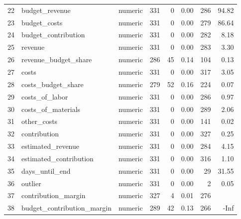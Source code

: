 \begin{sidewaystable}[ht]
\begin{tabular}{rllrrrrr}
  22 & budget\_revenue & numeric & 331 &   0 & 0.00 & 286 & 94.82 \\ 
  23 & budget\_costs & numeric & 331 &   0 & 0.00 & 279 & 86.64 \\ 
  24 & budget\_contribution & numeric & 331 &   0 & 0.00 & 282 & 8.18 \\ 
  25 & revenue & numeric & 331 &   0 & 0.00 & 283 & 3.30 \\ 
  26 & revenue\_budget\_share & numeric & 286 &  45 & 0.14 & 104 & 0.13 \\ 
  27 & costs & numeric & 331 &   0 & 0.00 & 317 & 3.05 \\ 
  28 & costs\_budget\_share & numeric & 279 &  52 & 0.16 & 224 & 0.07 \\ 
  29 & costs\_of\_labor & numeric & 331 &   0 & 0.00 & 286 & 0.97 \\ 
  30 & costs\_of\_materials & numeric & 331 &   0 & 0.00 & 289 & 2.06 \\ 
  31 & other\_costs & numeric & 331 &   0 & 0.00 & 141 & 0.02 \\ 
  32 & contribution & numeric & 331 &   0 & 0.00 & 327 & 0.25 \\ 
  33 & estimated\_revenue & numeric & 331 &   0 & 0.00 & 284 & 4.15 \\ 
  34 & estimated\_contribution & numeric & 331 &   0 & 0.00 & 316 & 1.10 \\ 
  35 & days\_until\_end & numeric & 331 &   0 & 0.00 &  29 & 31.55 \\ 
  36 & outlier & numeric & 331 &   0 & 0.00 &   2 & 0.05 \\ 
  37 & contribution\_margin & numeric & 327 &   4 & 0.01 & 276 &  \\ 
  38 & budget\_contribution\_margin & numeric & 289 &  42 & 0.13 & 266 & -Inf \\ 
   \hline
\end{tabular}
\end{sidewaystable}
